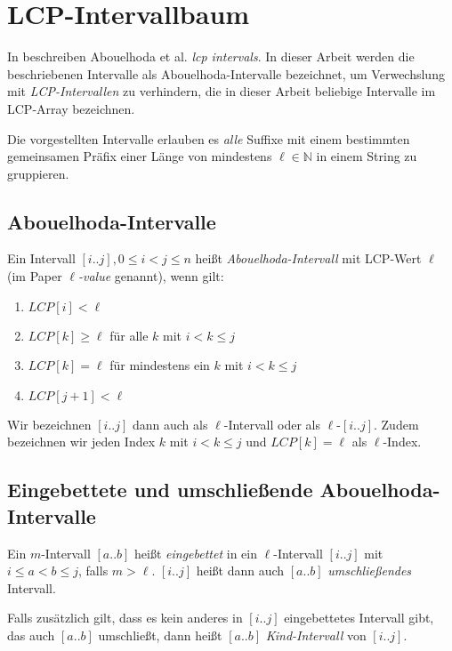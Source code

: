 \section{LCP-Intervallbaum}
\label{lcpintervals}

In \cite{abouelhoda_optimal_2002} beschreiben Abouelhoda et al. \textit{lcp intervals}. In dieser Arbeit werden die beschriebenen Intervalle als Abouelhoda-Intervalle bezeichnet, um Verwechslung mit \textit{LCP-Intervallen} zu verhindern, die in dieser Arbeit beliebige Intervalle im LCP-Array bezeichnen.

Die vorgestellten Intervalle erlauben es \emph{alle} Suffixe mit einem bestimmten gemeinsamen Präfix einer Länge von mindestens $\ell \in \mathbb{N}$ in einem String zu gruppieren.

\subsection{Abouelhoda-Intervalle}
\label{abouelhodaintervals}

Ein Intervall $[i..j], 0 \leq i < j \leq n$ heißt \emph{Abouelhoda-Intervall} mit LCP-Wert $\ell$ (im Paper $\ell$\emph{-value} genannt), wenn gilt:

\begin{enumerate}
	\item $LCP[i] < \ell$
	\item $LCP[k] \geq \ell$ für alle $k$ mit $i < k \leq j$
	\item $LCP[k] = \ell$ für mindestens ein $k$ mit $i < k \leq j$
	\item $LCP[j + 1] < \ell$
\end{enumerate}

Wir bezeichnen $[i..j]$ dann auch als $\ell$-Intervall oder als $\ell$-$[i..j]$. Zudem bezeichnen wir jeden Index $k$ mit $i < k \leq j$ und $LCP[k] = \ell$ als $\ell$-Index.

\subsection{Eingebettete und umschließende Abouelhoda-Intervalle}
\label{embeddedlcpintervals}

Ein $m$-Intervall $[a..b]$ heißt \textit{eingebettet} in ein $\ell$-Intervall $[i..j]$ mit $i \leq a < b \leq j$, falls $m > \ell$. $[i..j]$ heißt dann auch $[a..b]$ \textit{umschließendes} Intervall.

Falls zusätzlich gilt, dass es kein anderes in $[i..j]$ eingebettetes Intervall gibt, das auch $[a..b]$ umschließt, dann heißt $[a..b]$ \textit{Kind-Intervall} von $[i..j]$.

